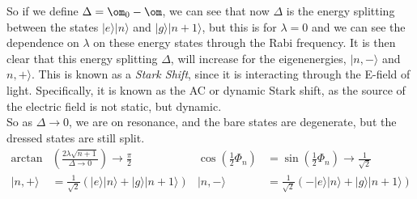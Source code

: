 \documentclass[a4paper, 11pt, normalem]{report}
\begin{document}
\begin{figure}[H]
    \centering
\end{figure}
So if we define $\Delta=\om_0-\om$, we can see that now $\Delta$ is the energy splitting between the states $|e\rangle|n\rangle$ and $|g\rangle|n+1\rangle$, but this is for $\lambda=0$ and we can see the dependence on $\lambda$ on these energy states through the Rabi frequency. 
It is then clear that this energy splitting $\Delta$, will increase for the eigenenergies, $|n,-\rangle$ and $n,+\rangle$.
This is known as a \emph{Stark Shift}, since it is interacting through the E-field of light. 
Specifically, it is known as the AC or dynamic Stark shift, as the source of the electric field is not static, but dynamic.\\
So as $\Delta\to0$, we are on resonance, and the bare states are degenerate, but the dressed states are still split.
\begin{align}
    \arctan&\left(\frac{2\lambda\sqrt{n+1}}{\Delta\to0}\right) \to \frac{\pi}{2} & \cos\left(\frac12\Phi_n\right) &= \sin\left(\frac12\Phi_n\right) \to \frac{1}{\sqrt{2}} \\
    |n,+\rangle &= \frac{1}{\sqrt{2}}\left(|e\rangle|n\rangle+|g\rangle|n+1\rangle\right) & |n,-\rangle &= \frac{1}{\sqrt{2}}\left(-|e\rangle|n\rangle+|g\rangle|n+1\rangle\right)
\end{align}
\end{document}
